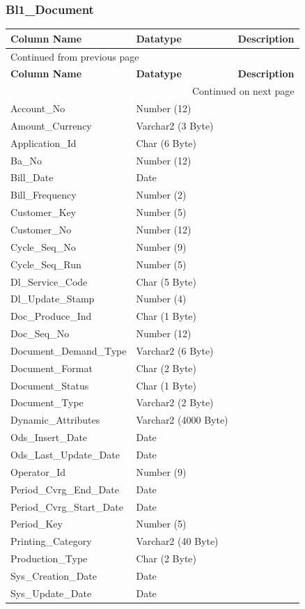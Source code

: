\documentclass[12pt,twoside]{article}
\begin{document}
\normalsize

\subsubsection{Bl1\_Document}
\label{sec:orgheadline145}
\footnotesize

\begin{longtable}{l|l|l}
\hline
\textbf{Column Name} & \textbf{Datatype} & \textbf{Description}\\
\hline
\endfirsthead
\multicolumn{3}{l}{Continued from previous page} \\
\hline

\textbf{Column Name} & \textbf{Datatype} & \textbf{Description} \\

\hline
\endhead
\hline\multicolumn{3}{r}{Continued on next page} \\
\endfoot
\endlastfoot
\hline
Account\_No & Number (12) & \\
Amount\_Currency & Varchar2 (3 Byte) & \\
Application\_Id & Char (6 Byte) & \\
Ba\_No & Number (12) & \\
Bill\_Date & Date & \\
Bill\_Frequency & Number (2) & \\
Customer\_Key & Number (5) & \\
Customer\_No & Number (12) & \\
Cycle\_Seq\_No & Number (9) & \\
Cycle\_Seq\_Run & Number (5) & \\
Dl\_Service\_Code & Char (5 Byte) & \\
Dl\_Update\_Stamp & Number (4) & \\
Doc\_Produce\_Ind & Char (1 Byte) & \\
Doc\_Seq\_No & Number (12) & \\
Document\_Demand\_Type & Varchar2 (6 Byte) & \\
Document\_Format & Char (2 Byte) & \\
Document\_Status & Char (1 Byte) & \\
Document\_Type & Varchar2 (2 Byte) & \\
Dynamic\_Attributes & Varchar2 (4000 Byte) & \\
Ods\_Insert\_Date & Date & \\
Ods\_Last\_Update\_Date & Date & \\
Operator\_Id & Number (9) & \\
Period\_Cvrg\_End\_Date & Date & \\
Period\_Cvrg\_Start\_Date & Date & \\
Period\_Key & Number (5) & \\
Printing\_Category & Varchar2 (40 Byte) & \\
Production\_Type & Char (2 Byte) & \\
Sys\_Creation\_Date & Date & \\
Sys\_Update\_Date & Date & \\
\hline
\end{longtable}
\end{document}

